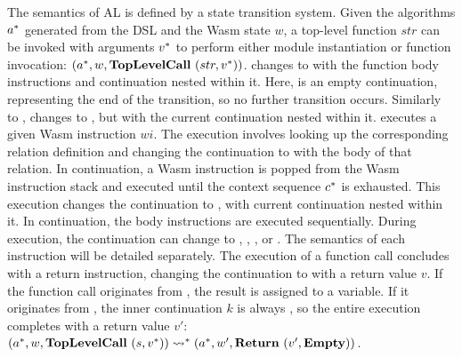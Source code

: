 The semantics of AL is defined by a state transition system.
Given the algorithms $a^*$ generated from the DSL and the Wasm state $w$, a
top-level function $str$ can be invoked with arguments $v^*$ to perform
either module instantiation or function invocation:
$(a^*, w, \textbf{TopLevelCall} ~ (str, v^*))$.
\toplevelcall{} changes to \algo{} with the function body instructions and
\mt{} continuation nested within it.
Here, \mt{} is an empty continuation, representing the end of the transition,
so no further transition occurs.
Similarly to \toplevelcall{}, \call{} changes to \algo{}, but with the current
continuation nested within it.
\exe{} executes a given Wasm instruction $wi$.
The execution involves looking up the corresponding relation definition and
changing the continuation to \algo{} with the body of that relation.
In \wasm{} continuation, a Wasm instruction is popped from the Wasm
instruction stack and executed until the context sequence $c^*$ is
exhausted.
This execution changes the continuation to \algo{}, with current continuation
nested within it.
In \algo{} continuation, the body instructions are executed sequentially.
During execution, the continuation can change to \call{}, \exe{}, \wasm{},
or \ret{}.
The semantics of each instruction will be detailed separately.
The execution of a function call concludes with a return instruction, changing
the continuation to \ret{} with a return value $v$.
If the function call originates from \call{}, the result is assigned to a
variable.
If it originates from \toplevelcall{}, the inner continuation $k$ is always
\mt, so the entire execution completes with a return value $v'$:
$
(a^*, w, \textbf{TopLevelCall} ~ (s, v^*))
\leadsto^*
(a^*, w', \textbf{Return} ~ (v', \textbf{Empty}))
$.





